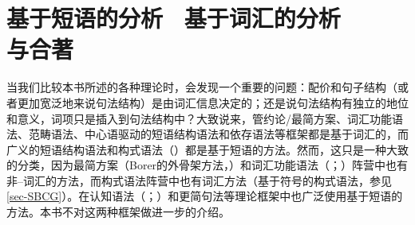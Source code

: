 \tocless\chapter{基于短语的分析 \ 基于词汇的分析\\[4mm]\large{与合著}}
\label{Abschnitt-Phrasal-Lexikalisch}\label{chap-phrasal}

当我们比较本书所述的各种理论时，会发现一个重要的问题：配价和句子结构（或者更加宽泛地来说句法结构）是由词汇信息决定的；还是说句法结构有独立的地位和意义，词项只是插入到句法结构中？大致说来，管约论/最简方案、词汇功能语法、范畴语法、中心语驱动的短语结构语法和依存语法等框架都是基于词汇的，而广义的短语结构语法和构式语法（\citealp{Goldberg95a,Goldberg2003b,Tomasello2003a,Tomasello2006c,Croft2001a}）都是基于短语的方法。然而，这只是一种大致的分类，因为最简方案（Borer的外骨架方法，\citeyear{Borer2003a-u}）和词汇功能语法（\citealp{Alsina96a}；\citealp{ADT2008a,ADT2013a}）阵营中也有非--词汇的方法，而构式语法阵营中也有词汇方法（基于符号的构式语法，参见\ref{sec-SBCG}）。在认知语法（\citealp{Dabrowska2001a}；\citealp[]{Langacker2009a}）和更简句法\citep{CJ2005a,Jackendoff2008a}等理论框架中也广泛使用基于短语的方法。本书不对这两种框架做进一步的介绍。

